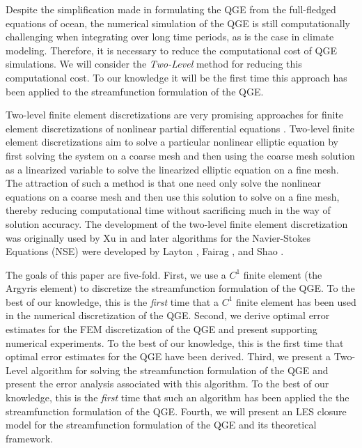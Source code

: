 Despite the simplification made in formulating the QGE from the full-fledged
equations of ocean, the numerical simulation of the QGE is still computationally
challenging when integrating over long time periods, as is the case in climate
modeling. Therefore, it is necessary to reduce the computational cost of QGE
simulations. We will consider the \emph{Two-Level} method for reducing this
computational cost. To our knowledge it will be the first time this approach has
been applied to the streamfunction formulation of the QGE.

Two-level finite element discretizations are very promising approaches for
finite element discretizations of nonlinear partial differential equations
\cite{Fairag98,Layton93}. Two-level finite element discretizations aim to
solve a particular nonlinear elliptic equation by first solving the system on a
coarse mesh and then using the coarse mesh solution as a linearized variable to
solve the linearized elliptic equation on  a fine mesh. The attraction of such a
method is that one need only solve the nonlinear equations on a coarse mesh and
then use this solution to solve on a fine mesh, thereby reducing computational
time without sacrificing much in the way of solution accuracy. The development
of the two-level finite element discretization was originally used by Xu in
\cite{Xu94} and later algorithms for the Navier-Stokes Equations (NSE) were
developed by Layton \cite{Layton93}, Fairag \cite{Fairag98, Fairag03}, and Shao
\cite{Shao11}.

The goals of this paper are five-fold. First, we use a $C^1$ finite element (the
Argyris element) to discretize the streamfunction formulation of the QGE. To the
best of our knowledge, this is the \emph{first} time that a $C^1$ finite element
has been used in the numerical discretization of the QGE. Second, we derive
optimal error estimates for the FEM discretization of the QGE and present
supporting numerical experiments. To the best of our knowledge, this is the
first time that optimal error estimates for the QGE have been derived.  Third,
we present a Two-Level algorithm for solving the streamfunction formulation of
the QGE and present the error analysis associated with this algorithm. To the
best of our knowledge, this is the \emph{first} time that such an algorithm has
been applied the the streamfunction formulation of the QGE.  Fourth, we will
present an LES closure model for the streamfunction formulation of the QGE and
its theoretical framework.
